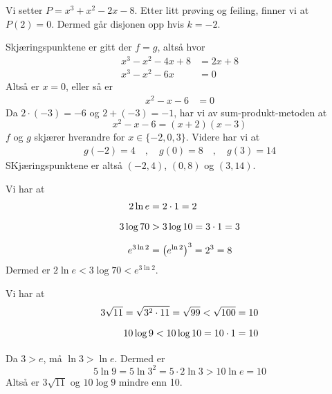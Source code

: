 Vi setter $P=x^3+x^2-2x-8$. Etter litt prøving og feiling, finner vi at $P(2)=0$. Dermed går disjonen opp hvis $k=-2$.\vsk

Skjæringspunktene er gitt der $f=g$, altså hvor
\begin{align*}
	x^3-x^2-4x+8 &= 2x+8 \\
	x^3-x^2-6x &= 0
\end{align*}
Altså er $x=0$, eller så er
\begin{align*}
	x^2-x-6 &= 0
\end{align*}
Da $2\cdot(-3)=-6$ og $2+(-3)=-1$, har vi av sum-produkt-metoden at
\[ x^2-x-6=(x+2)(x-3) \]
$f$ og $g$ skjærer hverandre for $x\in\{-2, 0, 3\}$.
Videre har vi at
\begin{align*}
	g(-2)=4\quad,\quad g(0)=8\quad,\quad g(3)=14
\end{align*}
SKjæringspunktene er altså $(-2, 4)$, $(0, 8)$ og $(3, 14)$.


Vi har at
\begin{align*}
	2\ln e &= 2\cdot 1=2 \vn
	3\log 70 &> 3 \log 10 =3\cdot1 =3 \vn
	e^{3 \ln 2} &= \left(e^{\ln 2}\right)^3 = 2^3=8
\end{align*}
Dermed er $2\ln e<3\log 70< e^{3\ln 2}$.

Vi har at
\begin{align*}
	3\sqrt{11}=\sqrt{3^2\cdot11}=\sqrt{99}<\sqrt{100}=10 \vn
	10\log 9 <10 \log 10 = 10\cdot1 =10 \vn
\end{align*}
Da $3>e$, må $\ln 3>\ln e$. Dermed er
\[ 5\ln 9=5\ln 3^2=5\cdot2\ln 3>10\ln e=10 \]
Altså er $3\sqrt{11}$ og $ 10\log 9 $ mindre enn 10.


